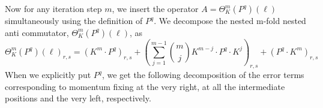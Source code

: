 \documentclass[sn-mathphys, Numbered ,a4paper]{sn-jnl}%
\DeclareMathOperator{\Z}{\mathbb{Z}}
\theoremstyle{plain}
\theoremstyle{definition}
\theoremstyle{remark}
\theoremstyle{plain}
\theoremstyle{definition}
\theoremstyle{remark}
\begin{document}
Now for any iteration step $m$, we insert the operator $A= \Theta^m_K(P^q)(\ell)$ simultaneously using the definition of $P^q$. We decompose the nested m-fold nested anti commutator, $\Theta^m_K(P^q)(\ell)$,  as
\begin{equation}
    \Theta^m_K(P^q)(\ell)_{r,s} = \left(K^m\cdot P^q\right)_{r,s} +\left(\sum\limits_{j=1}^{m-1} {{m}\choose j}K^{m-j}\cdot P^q\cdot K^{j}\right)_{r,s} +\left( P^q\cdot K^m\right)_{r,s} 
\end{equation}
When we explicitly put $P^q$, we get the following decomposition of the error terms corresponding to momentum fixing at the very right, at all the intermediate positions and the very left, respectively.
\end{document}
